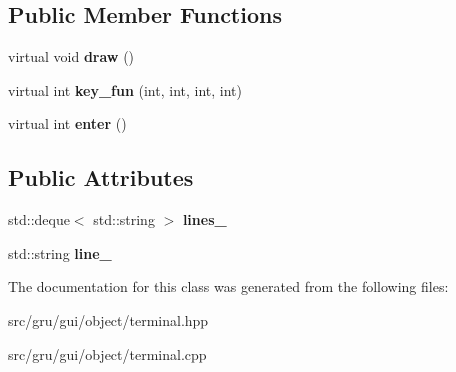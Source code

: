 \subsection*{\-Public \-Member \-Functions}
\begin{DoxyCompactItemize}
\item 
\hypertarget{classglutpp_1_1gui_1_1object_1_1terminal_aa6568349b7e7409360cded62433f6f58}{virtual void {\bfseries draw} ()}\label{classglutpp_1_1gui_1_1object_1_1terminal_aa6568349b7e7409360cded62433f6f58}

\item 
\hypertarget{classglutpp_1_1gui_1_1object_1_1terminal_a3d6f50eaddf7fda7ed5fb4027d1a9a5c}{virtual int {\bfseries key\-\_\-fun} (int, int, int, int)}\label{classglutpp_1_1gui_1_1object_1_1terminal_a3d6f50eaddf7fda7ed5fb4027d1a9a5c}

\item 
\hypertarget{classglutpp_1_1gui_1_1object_1_1terminal_a419430113f8d9a74d1300dc290a6d709}{virtual int {\bfseries enter} ()}\label{classglutpp_1_1gui_1_1object_1_1terminal_a419430113f8d9a74d1300dc290a6d709}

\end{DoxyCompactItemize}
\subsection*{\-Public \-Attributes}
\begin{DoxyCompactItemize}
\item 
\hypertarget{classglutpp_1_1gui_1_1object_1_1terminal_a7c39f20eb933d89385cd68cbc3fd540c}{std\-::deque$<$ std\-::string $>$ {\bfseries lines\-\_\-}}\label{classglutpp_1_1gui_1_1object_1_1terminal_a7c39f20eb933d89385cd68cbc3fd540c}

\item 
\hypertarget{classglutpp_1_1gui_1_1object_1_1terminal_ac00729aaa825f50b546ce77626c4d650}{std\-::string {\bfseries line\-\_\-}}\label{classglutpp_1_1gui_1_1object_1_1terminal_ac00729aaa825f50b546ce77626c4d650}

\end{DoxyCompactItemize}


\-The documentation for this class was generated from the following files\-:\begin{DoxyCompactItemize}
\item 
src/gru/gui/object/terminal.\-hpp\item 
src/gru/gui/object/terminal.\-cpp\end{DoxyCompactItemize}
